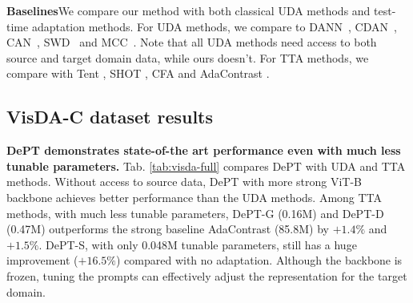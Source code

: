 \documentclass{article} \usepackage{iclr2023_conference,times}
\begin{document}
\textbf{Baselines}\quad We compare our method with both classical UDA methods and test-time adaptation methods. For UDA methods, we compare to DANN~\citep{ganin2015unsupervised}, CDAN~\citep{long2018conditional}, CAN~\citep{kang2019contrastive}, SWD~\citep{lee2019sliced} and MCC~\citep{jin2020minimum}. Note that all UDA methods need access to both source and target domain data, while ours doesn't. For TTA methods, we compare with Tent \citep{wang2020tent}, SHOT \citep{liang2020we}, CFA \citep{kojima2022robustifying} and AdaContrast \citep{chen2022contrastive}.


\subsection{VisDA-C dataset results}
\textbf{DePT demonstrates state-of-the art performance even with much less tunable parameters.} Tab. \ref{tab:visda-full} compares DePT with UDA and TTA methods. Without access to source data, DePT with more strong ViT-B backbone achieves better performance than the UDA methods. Among TTA methods, with much less tunable parameters, DePT-G (0.16M) and DePT-D (0.47M) outperforms the strong baseline AdaContrast (85.8M) by $+1.4\%$ and $+1.5\%$. DePT-S, with only 0.048M tunable parameters, still has a huge improvement ($+16.5\%$) compared with no adaptation. Although the backbone is frozen, tuning the prompts can effectively adjust the representation for the target domain.
\end{document}
